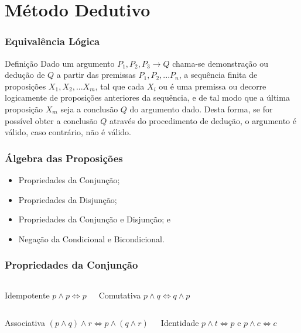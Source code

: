 \documentclass[aspectratio=169]{beamer} %
\begin{document}
\section{Método Dedutivo}

\begin{frame}
\frametitle{Equivalência Lógica}

\begin{block}{Definição}
Dado um argumento $P_{1}, P_{2}, P_{3} \rightarrow Q$ chama-se demonstração ou dedução de $Q$ a partir das premissas $P_{1}, P_{2}, . . . P_{n}$, a sequência finita de
proposições $X_{1}, X_{2}, . . . X_{m}$, tal que cada $X_{i}$ ou é uma premissa ou decorre logicamente de proposições anteriores da sequência, e de tal modo que a
última proposição $X_{m}$ seja a conclusão $Q$ do argumento dado. Desta forma, se for possível obter a conclusão $Q$ através do procedimento de dedução, o argumento é válido, caso contrário, não é válido.
\end{block}
\end{frame}

\begin{frame}
\frametitle{Álgebra das Proposições}

\begin{itemize}
	\item Propriedades da Conjunção;
	\item Propriedades da Disjunção;
	\item Propriedades da Conjunção e Disjunção; e
	\item Negação da Condicional e Bicondicional.
\end{itemize}
\end{frame}

\begin{frame}
\frametitle{Propriedades da Conjunção}

\begin{columns}[c]
	\large
\begin{block}{Idempotente}
$p \wedge p \Leftrightarrow p$
\end{block}\vfill

\begin{block}{Comutativa}
$p \wedge q \Leftrightarrow q \wedge p$
\end{block}
\end{columns}\vfill

\begin{columns}[c]
	\large
\begin{block}{Associativa}
$(p \wedge q) \wedge r \Leftrightarrow p \wedge (q \wedge r)$
\end{block}\vfill

\begin{block}{Identidade}
$p \wedge t \Leftrightarrow p$ e $p \wedge c \Leftrightarrow c$
\end{block}
\end{columns}\vfill

\end{frame}
\end{document}

